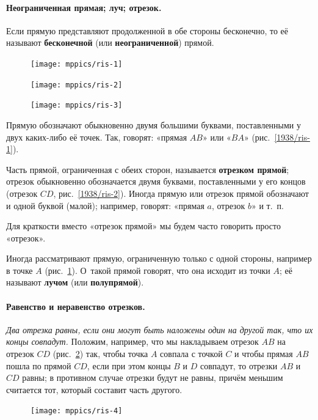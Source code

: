 \documentclass[oneside]{book}
\begin{document}
\paragraph{Неограниченная прямая; луч; отрезок.}\label{1938/5}
Если прямую представляют продолженной в обе стороны бесконечно, то её называют \textbf{бесконечной} (или \textbf{неограниченной}) прямой.

\begin{figure}
\centering
\texttt{[image: mppics/ris-1]}
\caption{}\label{1938/ris-1}
\bigskip
\texttt{[image: mppics/ris-2]}
\caption{}\label{1938/ris-2}
\bigskip
\texttt{[image: mppics/ris-3]}
\caption{}\label{1938/ris-3}
\end{figure}

Прямую обозначают обыкновенно двумя большими буквами, поставленными у двух каких-либо её точек.
Так, говорят:
«прямая $AB$» или «$BA$» (рис.~\ref{1938/ris-1}).

Часть прямой, ограниченная с обеих сторон, называется \textbf{отрезком прямой};
отрезок обыкновенно обозначается двумя буквами, поставленными у его концов (отрезок $CD$, рис.~\ref{1938/ris-2}).
Иногда прямую или отрезок прямой 
обозначают и одной буквой
(малой);
например, говорят:
«прямая $a$, отрезок $b$» и т.~п.

Для краткости вместо «отрезок прямой» мы будем часто говорить просто «отрезок».


Иногда рассматривают прямую, ограниченную только с одной стороны, например в точке $A$ (рис.~\ref{1938/ris-3}).
О~такой прямой говорят, что она исходит из точки $A$;
её называют \textbf{лучом} (или \textbf{полупрямой}). %

\paragraph{Равенство и неравенство отрезков.}\label{1938/6}
\emph{Два отрезка равны, если они могут быть наложены один на другой так, что их концы совпадут.}
Положим, например, что мы накладываем отрезок $AB$ на
отрезок $CD$ (рис.~\ref{1938/ris-4}) так, чтобы точка $A$ совпала с точкой $C$ и чтобы прямая $AB$ пошла по прямой $CD$, если при этом концы $B$ и $D$ совпадут, то отрезки $AB$ и $CD$ равны;
в противном случае отрезки будут не равны, причём меньшим считается тот, который составит часть другого.


\begin{figure}[h!]
\centering
\texttt{[image: mppics/ris-4]}
\caption{}\label{1938/ris-4}
\end{figure}
\end{document}
